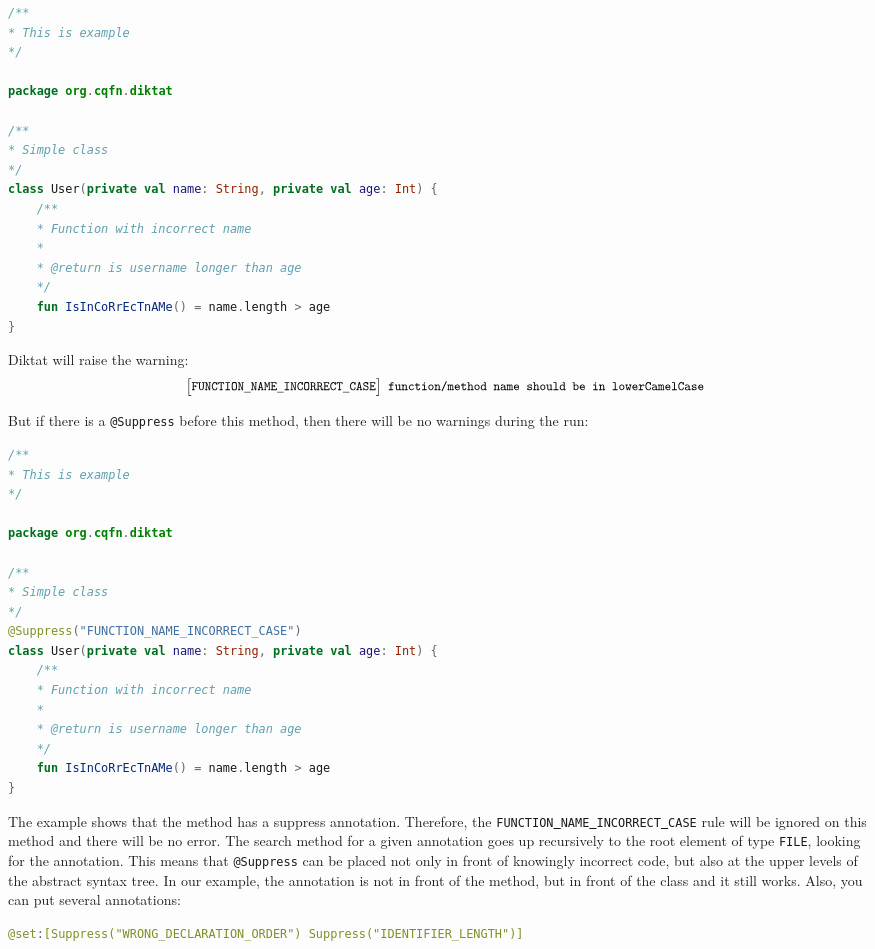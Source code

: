 \begin{lstlisting}[caption={Function with incorrect name.}, label={lst:example1}, language=Kotlin]
	/**
* This is example
*/

package org.cqfn.diktat

/**
* Simple class
*/
class User(private val name: String, private val age: Int) {
	/**
	* Function with incorrect name
	* 
	* @return is username longer than age
	*/
	fun IsInCoRrEcTnAMe() = name.length > age
}

\end{lstlisting}

Diktat will raise the warning: 
$$
\texttt{ \small{ $\big[$FUNCTION\underline{ }NAME\underline{ }INCORRECT\underline{ }CASE$\big]$  function/method name should be in lowerCamelCase}}
$$

But if there is a \texttt{@Suppress} before this method, then there will be no warnings during the run:
\begin{lstlisting}[caption={Function with incorrect name, but with suppressed Inspection.}, label={lst:example1}, language=Kotlin]
	/**
* This is example
*/

package org.cqfn.diktat

/**
* Simple class
*/
@Suppress("FUNCTION_NAME_INCORRECT_CASE")
class User(private val name: String, private val age: Int) {
	/**
	* Function with incorrect name
	* 
	* @return is username longer than age
	*/
	fun IsInCoRrEcTnAMe() = name.length > age
}

\end{lstlisting}

The example shows that the method has a suppress annotation. Therefore, the \texttt{FUNCTION\underline{ }NAME\underline{ }INCORRECT\underline{ }CASE} rule will be ignored on this method and there will be no error. The search method for a given annotation goes up recursively to the root element of type \texttt{FILE}, looking for the annotation. This means that \texttt{@Suppress} can be placed not only in front of knowingly incorrect code, but also at the upper levels of the abstract syntax tree. In our example, the annotation is not in front of the method, but in front of the class and it still works. Also, you can put several annotations:
\begin{lstlisting}[caption={Several suppression annotations}, label={lst:example1}, language=Kotlin]
@set:[Suppress("WRONG_DECLARATION_ORDER") Suppress("IDENTIFIER_LENGTH")]
\end{lstlisting}

